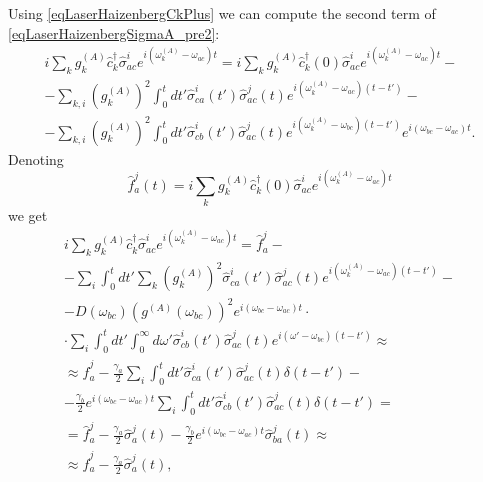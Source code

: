 Using \eqref{eqLaserHaizenbergCkPlus} we can compute the second
term of \eqref{eqLaserHaizenbergSigmaA_pre2}:
\begin{eqnarray}
i
\sum_{k}
g_k^{(A)}
\hat{c}_k^{\dag}\hat{\sigma}^{i}_{ac}  
e^{i\left(\omega_k^{(A)} - \omega_{ac}\right)t} = 
i
\sum_{k}
g_k^{(A)}
\hat{c}_k^{\dag}\left(0\right)\hat{\sigma}^{i}_{ac}  
e^{i\left(\omega_k^{(A)} - \omega_{ac}\right)t} -
\nonumber \\
-
\sum_{k,i} 
\left(g_{k}^{(A)}\right)^2
\int_0^t d t'
\hat{\sigma}_{ca}^{i}\left(t'\right)\hat{\sigma}^{j}_{ac}\left(t\right) 
e^{i\left(\omega_{k}^{(A)} - \omega_{ac}\right)\left(t-t'\right)}
-
\nonumber \\
-
\sum_{k,i} 
\left(g_{k}^{(A)}\right)^2
\int_0^t d t'
\hat{\sigma}_{cb}^{i}\left(t'\right)\hat{\sigma}^{j}_{ac}\left(t\right) 
e^{i\left(\omega_{k}^{(A)} - \omega_{bc}\right)\left(t-t'\right)}
e^{i\left(\omega_{bc} - \omega_{ac}\right)t}.
\nonumber
\end{eqnarray}
Denoting
\begin{equation}
\hat{f}_{a}^{j}\left(t\right) = i
\sum_{k}
g_k^{(A)}
\hat{c}_k^{\dag}\left(0\right)\hat{\sigma}^{i}_{ac}  
e^{i\left(\omega_k^{(A)} - \omega_{ac}\right)t}
\label{eqLaserHaizenbergFAJ}
\end{equation}
we get
\begin{eqnarray}
i
\sum_{k}
g_k^{(A)}
\hat{c}_k^{\dag}\hat{\sigma}^{i}_{ac}  
e^{i\left(\omega_k^{(A)} - \omega_{ac}\right)t} = \hat{f}_{a}^{j} -
\nonumber \\
-
\sum_i
\int_0^t d t'
\sum_k 
\left(g_{k}^{(A)}\right)^2
\hat{\sigma}_{ca}^{i}\left(t'\right)\hat{\sigma}^{j}_{ac}\left(t\right) 
e^{i\left(\omega_{k}^{(A)} - \omega_{ac}\right)\left(t-t'\right)}
-
\nonumber \\
-
D\left(\omega_{bc}\right)
\left(g^{(A)}\left(\omega_{bc}\right)\right)^2
e^{i\left(\omega_{bc} - \omega_{ac}\right)t} \cdot
\nonumber \\ 
\cdot
\sum_i 
\int_0^t d t'
\int_0^{\infty}d \omega' 
\hat{\sigma}_{cb}^{i}\left(t'\right)\hat{\sigma}^{j}_{ac}\left(t\right) 
e^{i\left(\omega' - \omega_{bc}\right)\left(t-t'\right)}
\approx
\nonumber \\
\approx
\hat{f}_{a}^{j}
- 
\frac{\gamma_{a}}{2}
\sum_i
\int_0^t d t'
\hat{\sigma}_{ca}^{i}\left(t'\right)\hat{\sigma}^{j}_{ac}\left(t\right) 
\delta\left(t-t'\right)
-
\nonumber \\
-
\frac{\gamma_{b}}{2}
e^{i\left(\omega_{bc} - \omega_{ac}\right)t}
\sum_i 
\int_0^t d t'
\hat{\sigma}_{cb}^{i}\left(t'\right)\hat{\sigma}^{j}_{ac}\left(t\right) 
\delta\left(t-t'\right) =
\nonumber \\
= \hat{f}_{a}^{j}
- 
\frac{\gamma_{a}}{2}
\hat{\sigma}_{a}^{j}\left(t\right) 
-
\frac{\gamma_{b}}{2}
e^{i\left(\omega_{bc} - \omega_{ac}\right)t}
\hat{\sigma}_{ba}^{j}\left(t\right) \approx
\nonumber \\
\approx
\hat{f}_{a}^{j}
- 
\frac{\gamma_{a}}{2}
\hat{\sigma}_{a}^{j}\left(t\right),
\label{eqLaserHaizenbergSigmaA_pre3}
\end{eqnarray}
